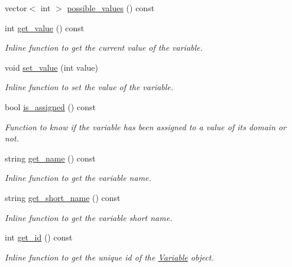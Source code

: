 \begin{DoxyCompactItemize}
vector$<$ int $>$ \hyperlink{classghost_1_1Variable_ab303d5c4c3c79cc5015e1f9df9fd9b76}{possible\-\_\-values} () const 
\item 
int \hyperlink{classghost_1_1Variable_a7bdebf8b2a369f337690ac38ece31793}{get\-\_\-value} () const 
\begin{DoxyCompactList}\small\item\em Inline function to get the current value of the variable. \end{DoxyCompactList}\item 
void \hyperlink{classghost_1_1Variable_a06f6c296986a017e1713961b4d763b0c}{set\-\_\-value} (int value)
\begin{DoxyCompactList}\small\item\em Inline function to set the value of the variable. \end{DoxyCompactList}\item 
bool \hyperlink{classghost_1_1Variable_a94d17cc057be3d1a3ff08a0d9e4b03e3}{is\-\_\-assigned} () const 
\begin{DoxyCompactList}\small\item\em Function to know if the variable has been assigned to a value of its domain or not. \end{DoxyCompactList}\item 
string \hyperlink{classghost_1_1Variable_a70c22841aa8d0ebe75eea92f1831c126}{get\-\_\-name} () const 
\begin{DoxyCompactList}\small\item\em Inline function to get the variable name. \end{DoxyCompactList}\item 
string \hyperlink{classghost_1_1Variable_a993e65196f2bcd0e5e5f4453736e36c5}{get\-\_\-short\-\_\-name} () const 
\begin{DoxyCompactList}\small\item\em Inline function to get the variable short name. \end{DoxyCompactList}\item 
int \hyperlink{classghost_1_1Variable_adc5da5dedaa3d47a5eb4092b08c3f77c}{get\-\_\-id} () const 
\begin{DoxyCompactList}\small\item\em Inline function to get the unique id of the \hyperlink{classghost_1_1Variable}{Variable} object. \end{DoxyCompactList}\end{DoxyCompactItemize}
